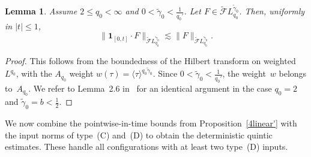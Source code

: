 \documentclass[11pt,reqno,english]{amsart}
\numberwithin{equation}{section}
\theoremstyle{plain}
\newtheorem{lemma}[theorem]{Lemma}
\theoremstyle{definition}
\theoremstyle{remark}
\begin{document}
\begin{lemma}\label{productrule}
	Assume $2\le q_0<\infty$ and $0<\widetilde{\gamma}_0<\frac{1}{q_0'}$.
	Let $F\in \widetilde{\mathcal{F}}L_{q_0}^{\widetilde{\gamma}_0}$.
	Then, uniformly in $|t|\le 1$,
	\[
	\|\mathbf{1}_{[0,t]}\cdot F\|_{\widetilde{\mathcal{F}}L_{q_0}^{\widetilde{\gamma}_0}}
	\lesssim
	\|F\|_{\widetilde{\mathcal{F}}L_{q_0}^{\widetilde{\gamma}_0}}.
	\]
\end{lemma}

\begin{proof}
	This follows from the boundedness of the Hilbert transform on weighted~$L^{q_0}$,
	with the $A_{q_0}$ weight $w(\tau)=\langle \tau\rangle^{q_0\widetilde{\gamma}_0}$.
	Since $0<\widetilde{\gamma}_0<\frac{1}{q_0'}$, the weight~$w$ belongs to~$A_{q_0}$.
	We refer to Lemma~2.6 in~\cite{OTW20} for an identical argument in the case $q_0=2$ and $\widetilde{\gamma}_0=b<\frac12$.
\end{proof}

We now combine the pointwise-in-time bounds from Proposition~\ref{4linear'} with the input norms of type~(C) and~(D) to obtain the deterministic quintic estimates. These handle all configurations with at least two type~(D) inputs.
\end{document}
